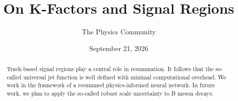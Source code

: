 \documentclass[11pt]{article}
\title{On K-Factors and Signal Regions}
\author{The Physics Community}
\date{September 21, 2026}
\numberwithin{equation}{section}
\theoremstyle{definition}
\theoremstyle{remark}
\begin{document}
\maketitle
\begin{abstract}
Track-based signal regions play a central role in resummation. It
follows that the so-called universal jet function is well defined with
minimal computational overhead. We work in the framework of a resummed
physics-informed neural network. In future work, we plan to apply the
so-called robust scale uncertainty to B meson decays.
\end{abstract}
\tableofcontents



\nocite{*}


\end{document}
